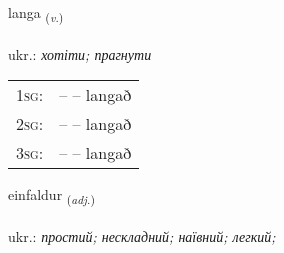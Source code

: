 \documentclass[frontgrid, backgrid]{flacards}\usepackage[]{graphicx}\usepackage[]{xcolor}
\begin{document}
\renewcommand{\flhead}{\vskip5pt \fboxsep=0pt {\small\bfseries\footnotesize Sagnorð | дієслово}}
\renewcommand{\fcfoot}{\vskip5pt \fboxsep=0pt \hspace{2pt}{\small\bfseries\footnotesize 1K}}

\renewcommand{\blhead}{\vskip5pt {\small\bfseries\footnotesize Sagnorð | дієслово }}
\renewcommand{\bcfoot}{\vskip5pt \hspace{2pt}{\small\bfseries\footnotesize 1K}}


{langa \small{\textsubscript{(\textit{v.})}} \\[1ex] %
\textphonetic{[lauŋka]} \\
ukr.: \emph{хотіти; прагнути} \\  [2ex]
\renewcommand*{\arraystretch}{0.8}
\begin{tabular}{p{1cm}l}
\textsc{1sg}: &  --  -- langað \\ 
\textsc{2sg}: &  --  -- langað \\ 
\textsc{3sg}: &  --  -- langað \\ 
\end{tabular}
}

\renewcommand{\flhead}{\vskip5pt \fboxsep=0pt {\small\bfseries\footnotesize Lýsingarorð | прикметник}}
\renewcommand{\fcfoot}{\vskip5pt \fboxsep=0pt \hspace{2pt}{\small\bfseries\footnotesize 1K}}

\renewcommand{\blhead}{\vskip5pt {\small\bfseries\footnotesize Lýsingarorð | прикметник }}
\renewcommand{\bcfoot}{\vskip5pt \hspace{2pt}{\small\bfseries\footnotesize 1K}}


{einfaldur \small{\textsubscript{(\textit{adj.})}} \\[1ex] %
\textphonetic{[einfaltʏr]} \\
ukr.: \emph{простий; нескладний; наївний; легкий;} \\  [2ex]
\renewcommand*{\arraystretch}{0.8}
}
\end{document}
